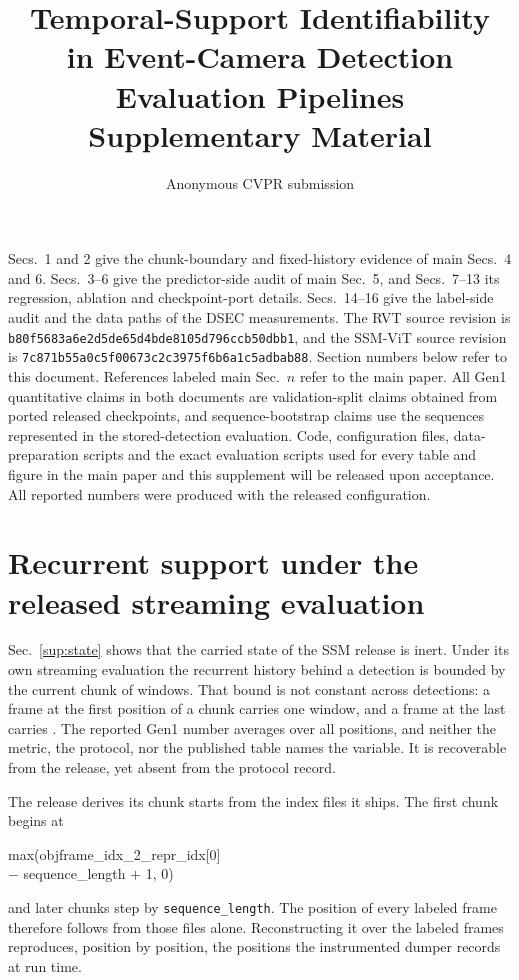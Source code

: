\documentclass[10pt,twocolumn,letterpaper]{article}
\title{Temporal-Support Identifiability\\
in Event-Camera Detection Evaluation Pipelines\\[0.3em]
\large Supplementary Material}
\author{Anonymous CVPR submission}
\begin{document}
\maketitle

\noindent
Secs.~1 and 2 give the chunk-boundary and fixed-history evidence of main Secs.~4 and 6. Secs.~3--6 give the predictor-side audit of main Sec.~5, and Secs.~7--13 its regression, ablation and checkpoint-port details. Secs.~14--16 give the label-side audit and the data paths of the DSEC measurements. The RVT source revision is
\texttt{b80f5683a6e2d5de65d4bde8105d796ccb50dbb1}, and the SSM-ViT source revision is
\texttt{7c871b55a0c5f00673c2c3975f6b6a1c5adbab88}. Section numbers below refer to this document. References labeled
main Sec.~$n$ refer to the main paper. All Gen1 quantitative claims in both documents are
validation-split claims obtained from ported released checkpoints, and sequence-bootstrap
claims use the \outSeqsScanned{} sequences represented in the stored-detection evaluation. Code, configuration files, data-preparation scripts and the exact evaluation scripts used for every table and figure in the main paper and this supplement will be released upon acceptance. All reported numbers were produced with the released configuration.

\section{Recurrent support under the released streaming evaluation}
\label{sup:support}

Sec.~\ref{sup:state} shows that the carried state of the SSM release is inert. Under
its own streaming evaluation the recurrent history behind a detection is bounded by
the current chunk of \ssmEvalChunk{} windows. That bound is not constant across detections:
a frame at the first position of a chunk carries one window, and a frame at the last carries
\ssmEvalChunk{}. The reported Gen1 number averages over all \ssmEvalChunk{} positions, and
neither the metric, the protocol, nor the published table names the variable. It is recoverable from the release, yet absent from the protocol record.

The release derives its chunk starts
from the index files it ships. The first chunk begins at
\begin{center}\footnotesize\ttfamily
max(objframe\_idx\_2\_repr\_idx[0]\\ $-$ sequence\_length $+$ 1, 0)
\end{center}
and later chunks step by \texttt{sequence\_length}. The position of every labeled frame
therefore follows from those files alone. Reconstructing it over the \mapFrames{} labeled frames reproduces, position by
position, the positions the instrumented dumper records at run time.
\end{document}
